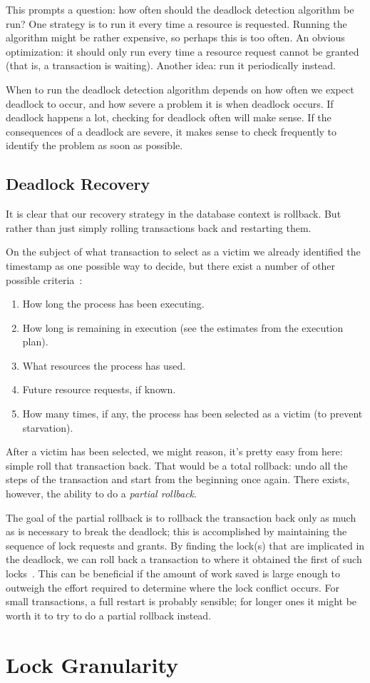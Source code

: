 This prompts a question: how often should the deadlock detection algorithm be run? One strategy is to run it every time a resource is requested. Running the algorithm might be rather expensive, so perhaps this is too often. An obvious optimization: it should only run every time a resource request cannot be granted (that is, a transaction is waiting). Another idea: run it periodically instead.

When to run the deadlock detection algorithm depends on how often we expect deadlock to occur, and how severe a problem it is when deadlock occurs. If deadlock happens a lot, checking for deadlock often will make sense. If the consequences of a deadlock are severe, it makes sense to check frequently to identify the problem as soon as possible.

\subsection*{Deadlock Recovery}

It is clear that our recovery strategy in the database context is rollback. But rather than just simply rolling transactions back and restarting them. 

On the subject of what transaction to select as a victim we already identified the timestamp as one possible way to decide, but there exist a number of other possible criteria~\cite{dsc}:

\begin{enumerate}
\item How long the process has been executing.
	\item How long is remaining in execution (see the estimates from the execution plan).
	\item What resources the process has used.
	\item Future resource requests, if known.
	\item How many times, if any, the process has been selected as a victim (to prevent starvation).
\end{enumerate}

After a victim has been selected, we might reason, it's pretty easy from here: simple roll that transaction back. That would be a total rollback: undo all the steps of the transaction and start from the beginning once again. There exists, however, the ability to do a \textit{partial rollback}. 

The goal of the partial rollback is to rollback the transaction back only as much as is necessary to break the deadlock;  this is accomplished by maintaining the sequence of lock requests and grants. By finding the lock(s) that are implicated in the deadlock, we can roll back a transaction to where it obtained the first of such locks~\cite{dsc}. This can be beneficial if the amount of work saved is large enough to outweigh the effort required to determine where the lock conflict occurs. For small transactions, a full restart is probably sensible; for longer ones it might be worth it to try to do a partial rollback instead.

\section*{Lock Granularity}




